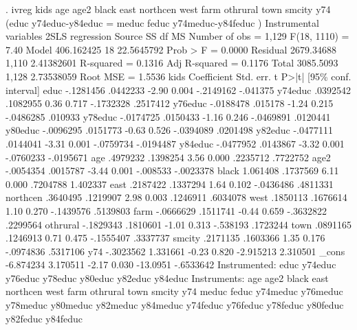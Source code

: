 . ivreg kids age age2 black east northcen west farm othrural town smcity y74 (educ y74educ-y84educ = meduc feduc y74meduc-y84feduc )
{\smallskip}
Instrumental variables 2SLS regression
{\smallskip}
      Source {\VBAR}       SS           df       MS      Number of obs   =     1,129
   F(18, 1110)     =      7.40
       Model {\VBAR}  406.162425        18  22.5645792   Prob > F        =    0.0000
    Residual {\VBAR}  2679.34688     1,110  2.41382601   R-squared       =    0.1316
   Adj R-squared   =    0.1176
       Total {\VBAR}   3085.5093     1,128  2.73538059   Root MSE        =    1.5536
{\smallskip}
        kids {\VBAR} Coefficient  Std. err.      t    P>|t|     [95\% conf. interval]
        educ {\VBAR}  -.1281456   .0442233    -2.90   0.004    -.2149162    -.041375
     y74educ {\VBAR}   .0392542   .1082955     0.36   0.717    -.1732328    .2517412
     y76educ {\VBAR}  -.0188478    .015178    -1.24   0.215    -.0486285     .010933
     y78educ {\VBAR}  -.0174725   .0150433    -1.16   0.246    -.0469891    .0120441
     y80educ {\VBAR}  -.0096295   .0151773    -0.63   0.526    -.0394089    .0201498
     y82educ {\VBAR}  -.0477111   .0144041    -3.31   0.001    -.0759734   -.0194487
     y84educ {\VBAR}  -.0477952   .0143867    -3.32   0.001    -.0760233   -.0195671
         age {\VBAR}   .4979232   .1398254     3.56   0.000     .2235712    .7722752
        age2 {\VBAR}  -.0054354   .0015787    -3.44   0.001     -.008533   -.0023378
       black {\VBAR}   1.061408   .1737569     6.11   0.000     .7204788    1.402337
        east {\VBAR}   .2187422   .1337294     1.64   0.102    -.0436486    .4811331
    northcen {\VBAR}   .3640495   .1219907     2.98   0.003     .1246911    .6034078
        west {\VBAR}   .1850113   .1676614     1.10   0.270    -.1439576    .5139803
        farm {\VBAR}  -.0666629   .1511741    -0.44   0.659    -.3632822    .2299564
    othrural {\VBAR}  -.1829343   .1810601    -1.01   0.313     -.538193    .1723244
        town {\VBAR}   .0891165   .1246913     0.71   0.475    -.1555407    .3337737
      smcity {\VBAR}   .2171135   .1603366     1.35   0.176    -.0974836    .5317106
         y74 {\VBAR}  -.3023562   1.331661    -0.23   0.820    -2.915213    2.310501
       _cons {\VBAR}  -6.874234   3.170511    -2.17   0.030     -13.0951   -.6533642
Instrumented: educ y74educ y76educ y78educ y80educ y82educ y84educ
 Instruments: age age2 black east northcen west farm othrural town smcity
              y74 meduc feduc y74meduc y76meduc y78meduc y80meduc y82meduc
              y84meduc y74feduc y76feduc y78feduc y80feduc y82feduc y84feduc
{\smallskip}
